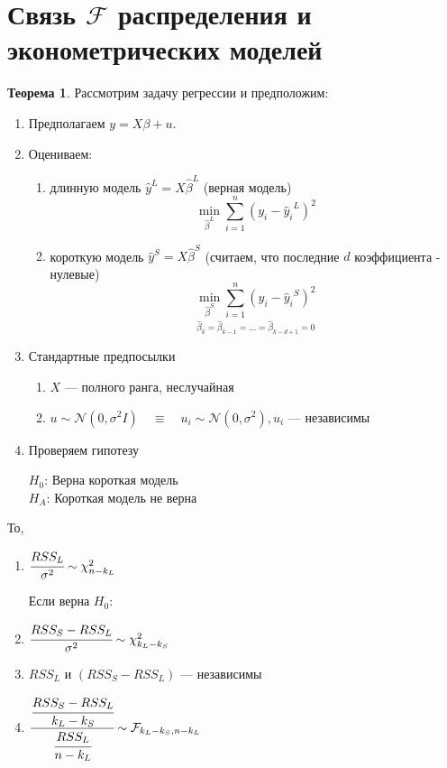 \documentclass[12pt]{article} %
\theoremstyle{definition} %
\def \hb{\hat{\beta}}
\def \s{\sigma}
\def \hy{\hat{y}}
\def \cN{\mathcal{N}}
\begin{document}
\section{Связь $\mathcal{F}$ распределения и эконометрических моделей}
\newtheorem*{theo_n}{Теорема}
\begin{theo_n}
    Рассмотрим задачу регрессии  и предположим:
    \begin{enumerate}
        \item Предполагаем $y=X\beta+u$.
        \item Оцениваем:
        \begin{enumerate}
            \item длинную модель $\hy^L = X\hb^L$ (верная модель)
            \[
                \underset{\hb^L}{\min}\sum_{i=1}^n \left(y_i - {\hy_i}^L \right)^2
            \]
            \item короткую модель $\hy^S = X\hb^S$ (считаем, что последние $d$ коэффициента - нулевые)
            \[
                \underset{\hb_k=\hb_{k-1}=...=\hb_{k-d+1}=0}{\underset{\hb^S}{\min}\sum_{i=1}^n\left(y_i - {\hy_i}^S \right)^2}
            \] 
        \end{enumerate} 
        \item Стандартные предпосылки
        \begin{enumerate}
            \item $X$ — полного ранга, неслучайная
            \item  $u \sim \cN(0, \s^2I) \quad \equiv \quad u_i \sim \cN(0,\s^2), u_i$ — независимы
        \end{enumerate}
        \item Проверяем гипотезу
         \begin{center}
            $H_0$: Верна короткая модель \\
            \hspace{0.5cm}$H_A$: Короткая модель не верна
        \end{center}
    \end{enumerate}
    То,
    \begin{enumerate}
        \item $\cfrac{RSS_L}{\s^2}\sim \mathcal{\chi}_{n-k_L}^2$\par
        Если верна $H_0$:
        \item $\cfrac{RSS_S - RSS_L}{\s^2}\sim \mathcal{\chi}_{k_L - k_S}^2$ 
        \item $RSS_L \text{ и } (RSS_S - RSS_L)$ — независимы
        \item $\cfrac{\cfrac{RSS_S - RSS_L}{k_L - k_S}}{{\cfrac{RSS_L}{n-k_L}}}\sim \mathcal{F}_{k_L - k_S, n-k_L}$
    \end{enumerate}
\end{theo_n}
\end{document}
